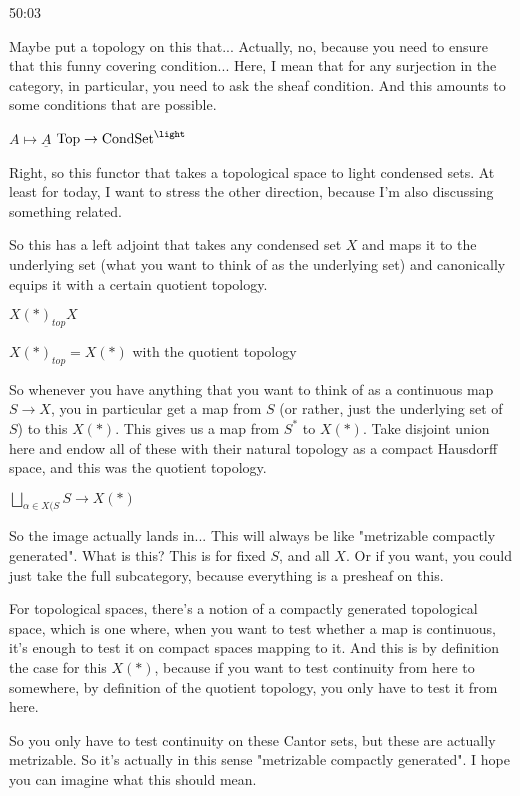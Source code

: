 \begin{example}
\begin{unfinished}{50:03}
\begin{remark}
Maybe put a topology on this that... Actually, no, because you need to ensure that this funny covering condition... Here, I mean that for any surjection in the category, in particular, you need to ask the sheaf condition. And this amounts to some conditions that are possible.

\end{remark}


\begin{proposition}
$A \mapsto \underline{A}$
$\Top \to \Cond\Set^{\light}$
\end{proposition}
Right, so this functor that takes a topological space to light condensed sets. At least for today, I want to stress the other direction, because I'm also discussing something related.

So this has a left adjoint that takes any condensed set $X$ and maps it to the underlying set (what you want to think of as the underlying set) and canonically equips it with a certain quotient topology.

$ X(*)_{top} X$

$ X(*)_{top} = X(*) $
with the quotient topology 

So whenever you have anything that you want to think of as a continuous map $S \to X$, you in particular get a map from $S$ (or rather, just the underlying set of $S$) to this $X(*)$. This gives us a map from $S^*$ to $X(*)$. Take disjoint union here and endow all of these with their natural topology as a compact Hausdorff space, and this was the quotient topology.

$ \bigsqcup_{\alpha \in X(S} S \to X(*)$

So the image actually lands in... This will always be like "metrizable compactly generated". What is this? This is for fixed $S$, and all $X$. Or if you want, you could just take the full subcategory, because everything is a presheaf on this.

For topological spaces, there's a notion of a compactly generated topological space, which is one where, when you want to test whether a map is continuous, it's enough to test it on compact spaces mapping to it. And this is by definition the case for this $X(*)$, because if you want to test continuity from here to somewhere, by definition of the quotient topology, you only have to test it from here.

So you only have to test continuity on these Cantor sets, but these are actually metrizable. So it's actually in this sense "metrizable compactly generated". I hope you can imagine what this should mean.


\end{unfinished}
\end{example}
